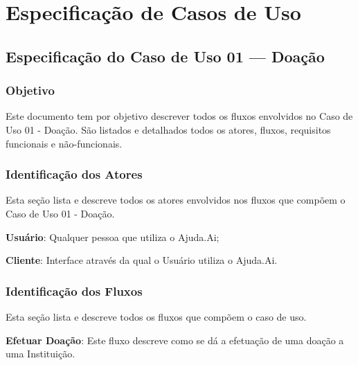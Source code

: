 \chapter{Especificação de Casos de Uso} \label{anexo:b}

\section*{Especificação do Caso de Uso 01 --- Doação}
\subsection*{Objetivo}
Este documento tem por objetivo descrever todos os fluxos envolvidos no Caso de Uso 01 - Doação. São listados e detalhados todos os atores, fluxos, requisitos funcionais e não-funcionais.

\subsection*{Identificação dos Atores}
Esta seção lista e descreve todos os atores envolvidos nos fluxos que compõem o Caso de Uso 01 - Doação.
\begin{lista}
  \item \textbf{Usuário}: Qualquer pessoa que utiliza o Ajuda.Ai;
  \item \textbf{Cliente}: Interface através da qual o Usuário utiliza o Ajuda.Ai.
\end{lista}

\subsection*{Identificação dos Fluxos}
Esta seção lista e descreve todos os fluxos que compõem o caso de uso.
\begin{lista}
  \item \textbf{Efetuar Doação}: Este fluxo descreve como se dá a efetuação de uma doação a uma Instituição.
\end{lista}

